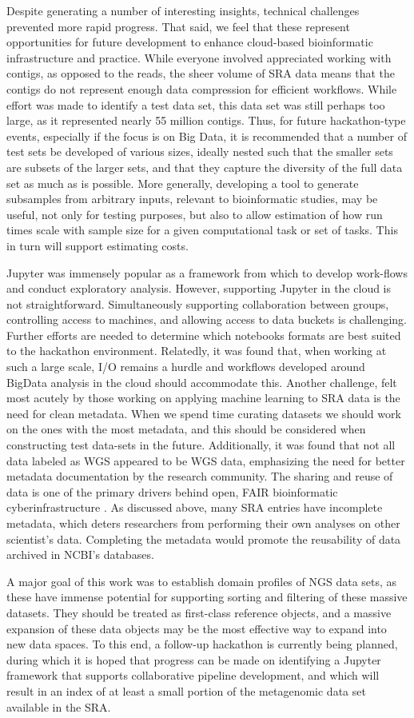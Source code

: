 Despite generating a number of interesting insights, technical challenges
prevented more rapid progress. That said, we feel that these represent
opportunities for future development to enhance cloud-based bioinformatic
infrastructure and practice. While everyone involved appreciated working with
contigs, as opposed to the reads, the sheer volume of SRA data means that the
contigs do not represent enough data compression for efficient workflows. While
effort was made to identify a test data set, this data set was still perhaps
too large, as it represented nearly 55 million contigs. Thus, for future
hackathon-type events, especially if the focus is on Big Data, it is
recommended that a number of test sets be developed of various sizes, ideally
nested such that the smaller sets are subsets of the larger sets, and that they
capture the diversity of the full data set as much as is possible. More
generally, developing a tool to generate subsamples from arbitrary inputs,
relevant to bioinformatic studies, may be useful, not only for testing
purposes, but also to allow estimation of how run times scale with sample size
for a given computational task or set of tasks. This in turn will support
estimating costs.

Jupyter was immensely popular as a framework from which to develop work-flows
and conduct exploratory analysis. However, supporting Jupyter in the cloud is
not straightforward. Simultaneously supporting collaboration between groups,
controlling access to machines, and allowing access to data buckets is
challenging. Further efforts are needed to determine which notebooks formats
are best suited to the hackathon environment. Relatedly, it was found that,
when working at such a large scale, I/O remains a hurdle and workflows
developed around BigData analysis in the cloud should accommodate this. Another
challenge, felt most acutely by those working on applying machine learning to
SRA data is the need for clean metadata. When we spend time curating datasets
we should work on the ones with the most metadata, and this should be
considered when constructing test data-sets in the future. Additionally, it was
found that not all data labeled as WGS appeared to be WGS data, emphasizing the
need for better metadata documentation by the research community. The sharing
and reuse of data is one of the primary drivers behind open, FAIR bioinformatic
cyberinfrastructure \cite{Wilkinson2016}. As discussed above, many SRA entries
have incomplete metadata, which deters researchers from performing their own
analyses on other scientist’s data. Completing the metadata would promote the
reusability of data archived in NCBI’s databases.

A major goal of this work was to establish domain profiles of NGS data sets, as
these have immense potential for supporting sorting and filtering of these
massive datasets. They should be treated as first-class reference objects, and
a massive expansion of these data objects may be the most effective way to
expand into new data spaces. To this end, a follow-up hackathon is currently
being planned, during which it is hoped that progress can be made on
identifying a Jupyter framework that supports collaborative pipeline
development, and which will result in an index of at least a small portion of
the metagenomic data set available in the SRA.
